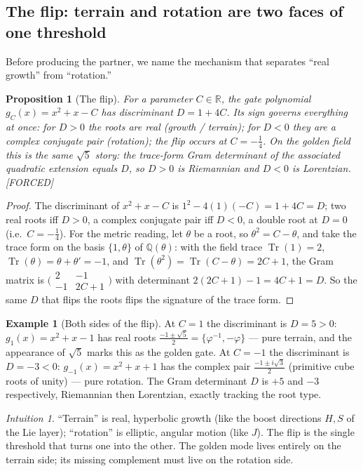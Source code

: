 \documentclass[11pt]{article}
\theoremstyle{plain}
\newtheorem{proposition}[theorem]{Proposition}
\theoremstyle{definition}
\newtheorem{example}[theorem]{Example}
\theoremstyle{remark}
\newtheorem{intuition}[theorem]{Intuition}
\newcommand{\Forced}{\textcolor{forcedc}{[FORCED]}}
\newcommand{\Tr}{\operatorname{Tr}}
\begin{document}
\subsection{The flip: terrain and rotation are two faces of one threshold}
Before producing the partner, we name the mechanism that separates ``real growth'' from ``rotation.''

\begin{proposition}[The flip]\label{prop:flip}
For a parameter $C∈ℝ$, the gate polynomial $g_C(x)=x^{2}+x-C$ has discriminant $D=1+4C$. Its sign governs everything at once: for $D>0$ the roots are real (growth / \emph{terrain}); for $D<0$ they are a complex conjugate pair (rotation); the flip occurs at $C=-\tfrac14$. On the golden field this is the same $\sqrt5$ story: the trace-form Gram determinant of the associated quadratic extension equals $D$, so $D>0$ is Riemannian and $D<0$ is Lorentzian. \Forced
\end{proposition}
\begin{proof}
The discriminant of $x^{2}+x-C$ is $1^{2}-4(1)(-C)=1+4C=D$; two real roots iff $D>0$, a complex conjugate pair iff $D<0$, a double root at $D=0$ (i.e.\ $C=-\tfrac14$). For the metric reading, let $θ$ be a root, so $θ^{2}=C-θ$, and take the trace form on the basis $\{1,θ\}$ of $ℚ(θ)$: with the field trace $\Tr(1)=2$, $\Tr(θ)=θ+θ'=-1$, and $\Tr(θ^{2})=\Tr(C-θ)=2C+1$, the Gram matrix is $\bigl(\begin{smallmatrix}2&-1\\-1&2C+1\end{smallmatrix}\bigr)$ with determinant $2(2C+1)-1=4C+1=D$. So the same $D$ that flips the roots flips the signature of the trace form.
\end{proof}

\begin{example}[Both sides of the flip]\label{ex:flip}
At $C=1$ the discriminant is $D=5>0$: $g_1(x)=x^{2}+x-1$ has real roots $\tfrac{-1\pm\sqrt5}{2}=\{φ^{-1},-φ\}$ --- pure terrain, and the appearance of $\sqrt5$ marks this as the golden gate. At $C=-1$ the discriminant is $D=-3<0$: $g_{-1}(x)=x^{2}+x+1$ has the complex pair $\tfrac{-1\pm i\sqrt3}{2}$ (primitive cube roots of unity) --- pure rotation. The Gram determinant $D$ is $+5$ and $-3$ respectively, Riemannian then Lorentzian, exactly tracking the root type.
\end{example}

\begin{intuition}
``Terrain'' is real, hyperbolic growth (like the boost directions $H,S$ of the Lie layer); ``rotation'' is elliptic, angular motion (like $J$). The flip is the single threshold that turns one into the other. The golden mode lives entirely on the terrain side; its missing complement must live on the rotation side.
\end{intuition}
\end{document}
